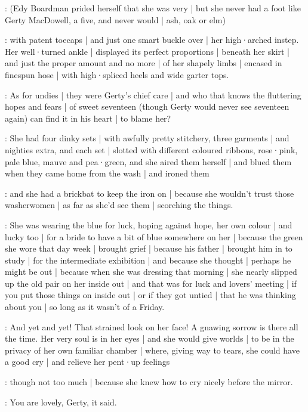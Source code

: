 \gertyJudgy:
(Edy Boardman prided herself that she was very  |
but she never had a foot like Gerty MacDowell,
a five,
and never would |
ash, oak or elm)

\gertyReal:
with patent toecaps |
and just one smart buckle over |
her high·arched instep.
Her well·turned ankle |
displayed its perfect proportions |
beneath her skirt |
and just the proper amount and no more |
of her shapely limbs |
encased in finespun hose |%
with high·spliced heels and wide garter tops.

\Nnovel:
As for undies |
they were Gerty's chief care |
and who that knows the fluttering hopes and fears |
of sweet seventeen
(though Gerty would never see seventeen again)
can find it in his heart |
to blame her?

\gertyReal:
She had four dinky sets |
with awfully pretty stitchery,
three garments |
and nighties extra,
and each set |
slotted with different coloured ribbons,
rose·pink,
pale blue,
mauve
and pea·green,
and she aired them herself |
and blued them
when they came home from the wash |
and ironed them

\gertyJudgy:
and she had a brickbat to keep the iron on |
because she wouldn't trust those washerwomen |
as far as she'd see them |
scorching the things.

\gertyRomantic:
She was wearing the blue for luck,
hoping against hope,%
her own colour |
and lucky too |
for a bride to have a bit of blue somewhere on her |
because the green she wore that day week |
brought grief |
because his father |
brought him in to study |
for the intermediate exhibition |
and because she thought |
perhaps he might be out |
because when she was dressing that morning |
she nearly slipped up the old pair on her inside out |
and that was for luck and lovers' meeting |
if you put those things on inside out |
or if they got untied |
that he was thinking about you |
so long as it wasn't of a Friday.

\gertyNovel:
And yet and yet!
That strained look on her face!
A gnawing sorrow is there all the time.
Her very soul is in her eyes |
and she would give worlds |
to be in the privacy of her own familiar chamber |
where,
giving way to tears,
she could have a good cry |
and relieve her pent·up feelings

\gertyReal:
though not too much |
because she knew how to cry nicely before the mirror.

\gertyRomantic:
You are lovely,
Gerty,
it said.

